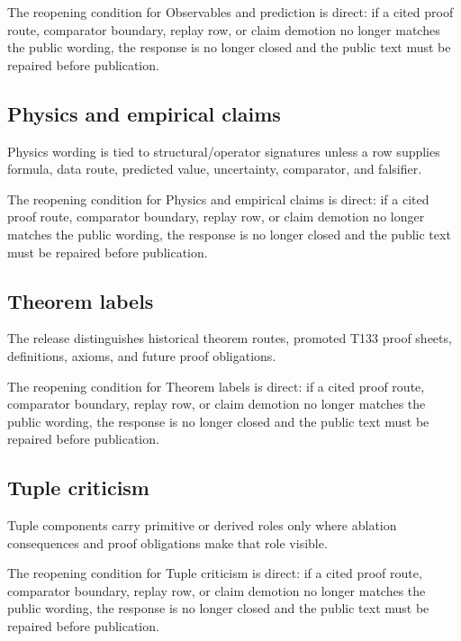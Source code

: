 The reopening condition for Observables and prediction is direct: if a cited proof route, comparator boundary, replay row, or claim demotion no longer matches the public wording, the response is no longer closed and the public text must be repaired before publication.


\subsection{Physics and empirical claims}

Physics wording is tied to structural/operator signatures unless a row supplies formula, data route, predicted value, uncertainty, comparator, and falsifier.


The reopening condition for Physics and empirical claims is direct: if a cited proof route, comparator boundary, replay row, or claim demotion no longer matches the public wording, the response is no longer closed and the public text must be repaired before publication.


\subsection{Theorem labels}

The release distinguishes historical theorem routes, promoted T133 proof sheets, definitions, axioms, and future proof obligations.


The reopening condition for Theorem labels is direct: if a cited proof route, comparator boundary, replay row, or claim demotion no longer matches the public wording, the response is no longer closed and the public text must be repaired before publication.


\subsection{Tuple criticism}

Tuple components carry primitive or derived roles only where ablation consequences and proof obligations make that role visible.


The reopening condition for Tuple criticism is direct: if a cited proof route, comparator boundary, replay row, or claim demotion no longer matches the public wording, the response is no longer closed and the public text must be repaired before publication.
